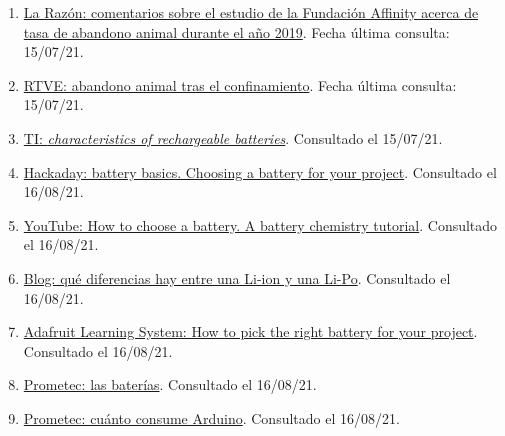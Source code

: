 \documentclass[12pt]{article}
\begin{document}
\begin{enumerate}
			\item
			\label{bib: enlace La Razón} \href{https://www.larazon.es/medio-ambiente/20201118/qxv6yuokargfbnjvknn6bhm4ze.html}{La Razón: comentarios sobre el estudio de la Fundación Affinity acerca de tasa de abandono animal durante el año 2019}. Fecha última consulta: 15/07/21.
			
			\item
			\label{bib: enlace RTVE} \href{https://www.rtve.es/noticias/20200608/abandonos-animales-domesticos-se-han-disparado-espana-durante-meses-confinamiento/2015761.shtml}{RTVE: abandono animal tras el confinamiento}. Fecha última consulta: 15/07/21.
			
			\item
			\label{bib: TI rechargeable batteries}
			\href{https://www.ti.com/lit/an/snva533/snva533.pdf}{TI: \textit{characteristics of rechargeable batteries}}. Consultado el 15/07/21.
			
			\item 
			\label{bib: Hackaday battery basics}
			\href{https://hackaday.com/2014/12/16/battery-basics-choosing-a-battery-for-your-project/}{Hackaday: battery basics. Choosing a battery for your project}. Consultado el 16/08/21.

			\item 
			\label{bib: YouTube How to choose  a battery}
			\href{https://www.youtube.com/watch?v=saxYilLJ7yw}{YouTube: How to choose a battery. A battery chemistry tutorial}. Consultado el 16/08/21.
			
			\item 
			\label{bib: blog diferencias li-ion y li-po}
			\href{https://blog.330ohms.com/2020/06/22/que-diferencias-hay-entre-una-li-po-y-una-li-ion/}{Blog: qué diferencias hay entre una Li-ion y una Li-Po}. Consultado el 16/08/21.
			
			\item 
			\label{bib: adafruit pick the right battery}
			\href{https://learn.adafruit.com/all-about-batteries/how-to-pick-the-right-battery-for-your-project}{Adafruit Learning System: How to pick the right battery for your project}. Consultado el 16/08/21.
			
			\item 
			\label{bib: prometec baterías para proyectos con arduino}
			\href{https://www.prometec.net/arduino-baterias/}{Prometec: las baterías}. Consultado el 16/08/21.
			
			\item 
			\label{bib: prometec consumo Arduino}
			\href{https://www.prometec.net/consumos-arduino/}{Prometec: cuánto consume Arduino}. Consultado el 16/08/21.
			

\end{enumerate}
\end{document}

